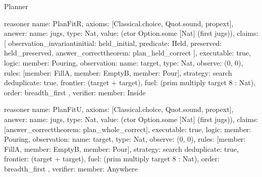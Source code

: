\begin{lexlean}{Planner}
\begin{semanticmodule}
reasoner{
  name: PlanFitR,
  axioms: [Classical.choice, Quot.sound, propext],
  answer: {name: jugs, type: Nat, value: (ctor Option.some [Nat] (first jugs))},
  claims: [
    observation_invariant{initial: held_initial, predicate: Held, preserved: held_preserved},
    answer_correct{theorem: plan_held_correct}
  ],
  executable: true,
  logic: {member: Pouring},
  observation: {name: target, type: Nat},
  observe: (0, 0),
  rules: [{member: FillA}, {member: EmptyB}, {member: Pour}],
  strategy: search{
    deduplicate: true,
    frontier: (target + target),
    fuel: (prim multiply target 8 : Nat),
    order: breadth_first
  },
  verifier: {member: Inside}
}

reasoner{
  name: PlanFitU,
  axioms: [Classical.choice, Quot.sound, propext],
  answer: {name: jugs, type: Nat, value: (ctor Option.some [Nat] (first jugs))},
  claims: [answer_correct{theorem: plan_whole_correct}],
  executable: true,
  logic: {member: Pouring},
  observation: {name: target, type: Nat},
  observe: (0, 0),
  rules: [{member: FillA}, {member: EmptyB}, {member: Pour}],
  strategy: search{
    deduplicate: true,
    frontier: (target + target),
    fuel: (prim multiply target 8 : Nat),
    order: breadth_first
  },
  verifier: {member: Anywhere}
}
\end{semanticmodule}
\end{lexlean}
